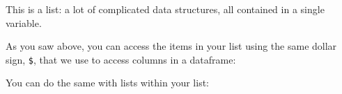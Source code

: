 \documentclass[]{book}
\newenvironment{Shaded}{\begin{snugshade}}{\end{snugshade}}
\newcommand{\DecValTok}[1]{\textcolor[rgb]{0.00,0.00,0.81}{#1}}
\newcommand{\NormalTok}[1]{#1}
\newcommand{\OperatorTok}[1]{\textcolor[rgb]{0.81,0.36,0.00}{\textbf{#1}}}
\begin{document}
\begin{Shaded}
\end{Shaded}

This is a list: a lot of complicated data structures, all contained in a single variable.

As you saw above, you can access the items in your list using the same dollar sign, \texttt{\$}, that we use to access columns in a dataframe:

\begin{Shaded}
\end{Shaded}

You can do the same with lists within your list:

\begin{Shaded}
\end{Shaded}
\end{document}
